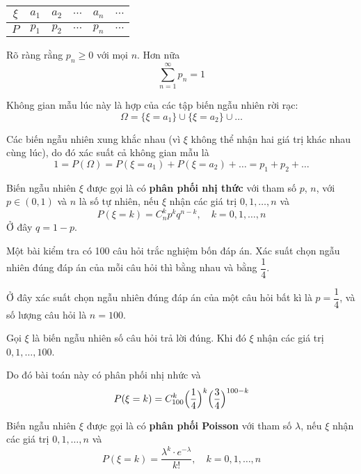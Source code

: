 \begin{table}[ht]
    \centering
    \begin{tabular}{c|c c c c c}
        $\xi$ & $a_1$ & $a_2$ & $\cdots$ & $a_n$ & $\cdots$ \\ \hline $P$ & $p_1$ & $p_2$ & $\cdots$ & $p_n$ & $\cdots$
    \end{tabular}
\end{table}

Rõ ràng rằng $p_n \geq 0$ với mọi $n$. Hơn nữa \[ \sum_{n=1}^\infty p_n = 1 \]

Không gian mẫu lúc này là hợp của các tập biến ngẫu nhiên rời rạc: \[ \Omega = \{ \xi = a_1 \} \cup \{ \xi = a_2 \} \cup \ldots \]

Các biến ngẫu nhiên xung khắc nhau (vì $\xi$ không thể nhận hai giá trị khác nhau cùng lúc), do đó xác suất cả không gian mẫu là \[ 1 = P(\Omega) = P(\xi = a_1) + P(\xi = a_2) + \ldots = p_1 + p_2 + \ldots \]

\begin{definition}
    Biến ngẫu nhiên $\xi$ được gọi là có \textbf{phân phối nhị thức} với tham số $p$, $n$, với $p \in (0, 1)$ và $n$ là số tự nhiên, nếu $\xi$ nhận các giá trị $0, 1, \ldots, n$ và 
    \begin{equation}
        P(\xi = k) = C^k_n p^k q^{n-k}, \quad k = 0, 1, \ldots, n
    \end{equation}
    Ở đây $q = 1 - p$.
\end{definition}

\begin{example}
    Một bài kiểm tra có 100 câu hỏi trắc nghiệm bốn đáp án. Xác suất chọn ngẫu nhiên đúng đáp án của mỗi câu hỏi thì bằng nhau và bằng $\dfrac{1}{4}$.

    Ở đây xác suất chọn ngẫu nhiên đúng đáp án của một câu hỏi bất kì là $p = \dfrac{1}{4}$, và số lượng câu hỏi là $n = 100$.

    Gọi $\xi$ là biến ngẫu nhiên số câu hỏi trả lời đúng. Khi đó $\xi$ nhận các giá trị $0, 1, \ldots, 100$.

    Do đó bài toán này có phân phối nhị nhức và \[ P(\xi = k) = C^k_{100} \Bigl(\dfrac{1}{4}\Bigr)^k \Bigl(\dfrac{3}{4}\Bigr)^{100-k}\]    
\end{example}

\begin{definition}
    Biến ngẫu nhiên $\xi$ được gọi là có \textbf{phân phối Poisson} với tham số $\lambda$, nếu $\xi$ nhận các giá trị $0, 1, \ldots, n$ và 
    \begin{equation}
        P(\xi = k) = \dfrac{\lambda^k \cdot e^{-\lambda}}{k!}, \quad k = 0, 1, \ldots, n
    \end{equation}
\end{definition}

